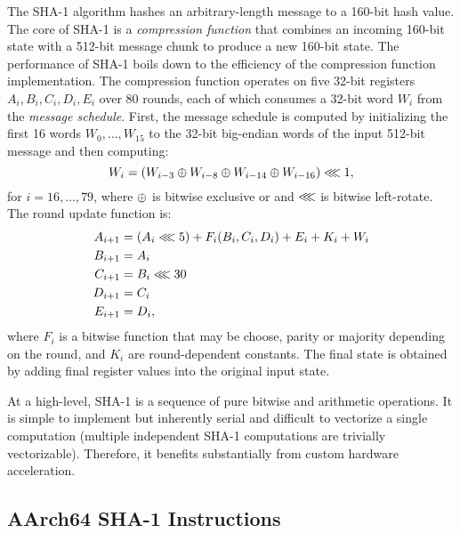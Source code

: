 The SHA-1 algorithm hashes an arbitrary-length message to a 160-bit hash value.
The core of SHA-1 is a \emph{compression function} that combines an incoming
160-bit state with a 512-bit message chunk to produce a new 160-bit state. The
performance of SHA-1 boils down to the efficiency of the compression function
implementation. The compression function operates on five 32-bit registers $A_i,
B_i, C_i, D_i, E_i$ over 80 rounds, each of which consumes a 32-bit word $W_i$
from the \emph{message schedule}. First, the message schedule is computed by
initializing the first 16 words $W_0, \ldots, W_{15}$ to the 32-bit big-endian
words of the input 512-bit message and then computing:
%
\begin{equation*}
W_i = \left( W_{i-3} \oplus W_{i-8} \oplus W_{i-14} \oplus W_{i-16} \right) \lll 1,
\end{equation*}
%
for $i = 16, \ldots, 79$, where $\oplus$ is bitwise exclusive or and $\lll$ is
bitwise left-rotate.  The round update function is:
%
\begin{align*}
A_{i+1} &= \left( A_i \lll 5 \right) + F_i(B_i, C_i, D_i) + E_i + K_i + W_i \\
B_{i+1} &= A_i \\
C_{i+1} &= B_i \lll 30 \\
D_{i+1} &= C_i \\
E_{i+1} &= D_i,
\end{align*}
%
where $F_i$ is a bitwise function that may be choose, parity or majority
depending on the round, and $K_i$ are round-dependent constants.  The final
state is obtained by adding final register values into the original input state.

At a high-level, SHA-1 is a sequence of pure bitwise and arithmetic operations.
It is simple to implement but inherently serial and difficult to vectorize a
single computation (multiple independent SHA-1 computations are trivially
vectorizable). Therefore, it benefits substantially from custom hardware
acceleration.

\subsection{AArch64 SHA-1 Instructions}

